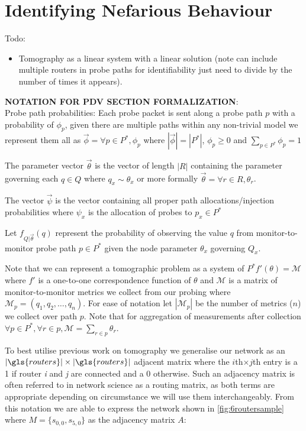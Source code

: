     
\section{Identifying Nefarious Behaviour}
\label{sec:MNefidentification}
Todo:
\begin{itemize}
    \item Tomography as a linear system with a linear solution (note can include multiple routers in probe paths for identifiability just need to divide by the number of times it appears).
\end{itemize}

    \begin{mdframed}
    \textbf{NOTATION FOR PDV SECTION FORMALIZATION}:\\
    Probe path probabilities: Each probe packet is sent along a probe path $p$ with a probability of $\phi_p$, given there are multiple paths within any non-trivial model we represent them all as $\vec{\phi}=\forall p\in P^*, \phi_p$ where $|\vec{\phi}|=|P^*|$, $\phi_p \geq 0$ and $\sum_{p\in P^*}\phi_p = 1$
    
    The parameter vector $\vec{\theta}$ is the vector of length $|R|$ containing the parameter governing each $q\in Q$ where $ q_x \sim \theta_x$ or more formally $\vec{\theta}=\forall r\in R, \theta_r$.
    
    The vector $\vec{\psi}$ is the vector containing all proper path allocations/injection probabilities where $\psi_x$ is the allocation of probes to $p_x\in P^*$ 
    
    Let $f_{Q|\vec{\theta}}(q)$ represent the probability of observing the value $q$ from monitor-to-monitor probe path $p\in P^*$ given the node parameter $\theta_x$ governing $Q_x$.
    
    Note that we can represent a tomographic problem as a system of $P^*f'(\theta)=\mathcal{M}$ where $f'$ is a one-to-one correspondence function of $\theta$ and $\mathcal{M}$ is a matrix of monitor-to-monitor metrics we collect from our probing where $\mathcal{M}_p = (q_1,q_2,\ldots, q_n)$. For ease of notation let $|\mathcal{M}_p|$ be the number of metrics ($n$) we collect over path $p$. Note that for aggregation of measurements after collection $\forall p\in P^*, \forall r\in p, \mathcal{M}=\sum_{r\in p}\theta_r$.
    \end{mdframed}

    To best utilise previous work on tomography we generalise our network as an $|\gls{routers}|\times|\gls{routers}|$ adjacent matrix where the $i$th$\times j$th entry is a 1 if router \emph{i} and \emph{j} are connected and a 0 otherwise. Such an adjacency matrix is often referred to in network science as a routing matrix, as both terms are appropriate depending on circumstance we will use them interchangeably. From this notation we are able to express the network shown in \cref{fig:6routersample} where $M=\{s_{0,0},s_{5,0}\}$ as the adjacency matrix $A$:
    
